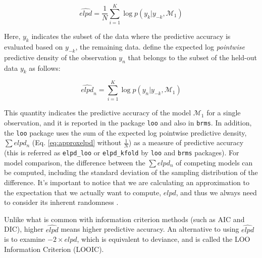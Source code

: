 \documentclass[12pt,]{krantz}
\theoremstyle{definition}
\theoremstyle{definition}
\theoremstyle{definition}
\theoremstyle{remark}
\begin{document}
\begin{equation}
\widehat{elpd} =  \frac{1}{N} \sum_{i=1}^{K} \log  p(y_k| y_{-k}, \mathcal{M}_1)
\label{eq:approxelpd}
\end{equation}

Here, \(y_k\) indicates the subset of the data where the predictive accuracy is evaluated based on \(y_{-k}\), the remaining data. \citet{vehtariPracticalBayesianModel2017} define the expected log \emph{pointwise} predictive density of the observation \(y_n\) that belongs to the subset of the held-out data \(y_{k}\) as follows:

\begin{equation}
\widehat{elpd}_{n} = \sum_{i=1}^{K} \log  p(y_n| y_{-k}, \mathcal{M}_1)
\end{equation}

This quantity indicates the predictive accuracy of the model \(\mathcal{M}_1\) for a single observation, and it is reported in the package \texttt{loo} and also in \texttt{brms}. In addition, the \texttt{loo} package uses the sum of the expected log pointwise predictive density, \(\sum elpd_n\) (Eq. \eqref{eq:approxelpd} without \(\frac{1}{N}\)) as a measure of predictive accuracy (this is referred as \texttt{elpd\_loo} or \texttt{elpd\_kfold} by \texttt{loo} and \texttt{brms} packages). For model comparison, the difference between the \(\sum elpd_n\) of competing models can be computed, including the standard deviation of the sampling distribution of the difference. It's important to notice that we are calculating an approximation to the expectation that we actually want to compute, \(elpd\), and thus we always need to consider its inherent randomness \citep{vehtariLimitationsLimitationsBayesian2019}.

Unlike what is common with information criterion methods (such as AIC and DIC), higher \(\widehat{elpd}\) means higher predictive accuracy.
An alternative to using \(\widehat{elpd}\) is to examine \(-2\times \widehat{elpd}\), which is equivalent to deviance, and is called the LOO Information Criterion (LOOIC).
\end{document}
